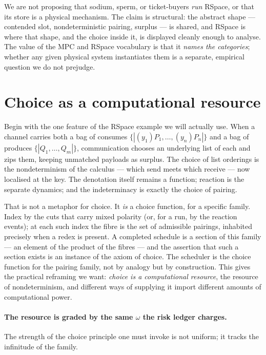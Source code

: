 \begin{remark}
We are not proposing that sodium, sperm, or ticket-buyers \emph{run} RSpace, or that
its store is a physical mechanism. The claim is structural: the abstract shape ---
contended slot, nondeterministic pairing, surplus --- is shared, and RSpace is where
that shape, and the choice inside it, is displayed cleanly enough to analyse. The
value of the MPC and RSpace vocabulary is that it \emph{names the categories};
whether any given physical system instantiates them is a separate, empirical
question we do not prejudge.
\end{remark}


\section{Choice as a computational resource}\label{ndo:sec:choice}

Begin with the one feature of the RSpace example we will actually use. When a
channel carries both a bag of consumes $\{\!|(y_1)P_1,\dots,(y_n)P_n|\!\}$ and a
bag of produces $\{\!|Q_1,\dots,Q_m|\!\}$, communication chooses an underlying
list of each and zips them, keeping unmatched payloads as surplus. The choice of
list orderings is the nondeterminism of the calculus --- which send meets which
receive --- now localised at the key. The denotation itself remains a function;
reaction is the separate dynamics; and the indeterminacy is exactly the choice of
pairing.

That is not a metaphor for choice. It \emph{is} a choice function, for a specific
family. Index by the cuts that carry mixed polarity (or, for a run, by the
reaction events); at each such index the fibre is the set of admissible pairings,
inhabited precisely when a redex is present. A completed schedule is a section of
this family --- an element of the product of the fibres --- and the assertion that
such a section exists is an instance of the axiom of choice. The scheduler is the
choice function for the pairing family, not by analogy but by construction. This
gives the practical reframing we want: \emph{choice is a computational resource},
the resource of nondeterminism, and different ways of supplying it import
different amounts of computational power.

\paragraph{The resource is graded by the same $\omega$ the risk ledger charges.}
The strength of the choice principle one must invoke is not uniform; it tracks
the infinitude of the family.

